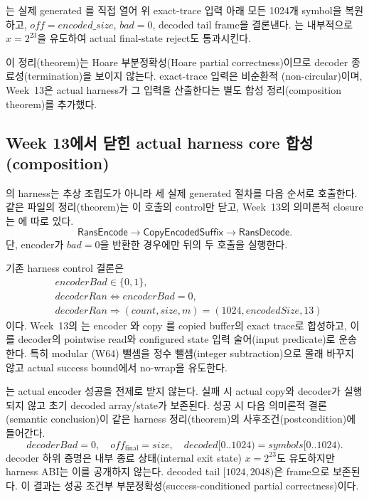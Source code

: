 \begin{verified}
는 실제 generated
를 직접 열어 위 exact-trace 입력 아래 모든 1024개
symbol을 복원하고, \(off=encoded\_size\), \(bad=0\), decoded tail frame을
결론낸다. 는 내부적으로
\(x=2^{23}\)을 유도하여 actual final-state reject도 통과시킨다.
\end{verified}

이 정리(theorem)는 Hoare 부분정확성(Hoare partial correctness)이므로 decoder
종료성(termination)을 보이지 않는다. exact-trace 입력은 비순환적
(non-circular)이며, Week~13은 actual harness가 그 입력을 산출한다는 별도 합성
정리(composition theorem)를 추가했다.

\subsection{Week 13에서 닫힌 actual harness core 합성(composition)}

의 harness는 추상 조립도가 아니라 세 실제
generated 절차를 다음 순서로 호출한다. 같은 파일의 정리(theorem)는 이 호출의
control만 닫고, Week~13의 의미론적 closure는
에 따로 있다.
\[
\mathsf{RansEncode}
\longrightarrow
\mathsf{CopyEncodedSuffix}
\longrightarrow
\mathsf{RansDecode}.
\]
단, encoder가 \(bad=0\)을 반환한 경우에만 뒤의 두 호출을 실행한다.

기존 harness control 결론은
\[
\begin{aligned}
  &\mathit{encoderBad}\in\{0,1\},\\
  &\mathit{decoderRan}\Longleftrightarrow\mathit{encoderBad}=0,\\
  &\mathit{decoderRan}\Longrightarrow
    (count,size,m)=(1024,\mathit{encodedSize},13)
\end{aligned}
\]
이다. Week~13의 는 encoder
와 copy 를 copied buffer의
exact trace로 합성하고, 이를 decoder의 pointwise read와 configured state 입력
술어(input predicate)로 운송한다. 특히 modular (W64) 뺄셈을 정수 뺄셈(integer
subtraction)으로 몰래 바꾸지 않고 actual success bound에서 no-wrap을 유도한다.

\begin{verified}
는 actual encoder 성공을
전제로 받지 않는다. 실패 시 actual copy와 decoder가 실행되지 않고 초기 decoded
array/state가 보존된다. 성공 시 다음 의미론적 결론(semantic conclusion)이 같은
harness 정리(theorem)의 사후조건(postcondition)에 들어간다.
\[
  \mathit{decoderBad}=0,\quad
  off_{\mathrm{final}}=size,\quad
  decoded[0..1024)=symbols[0..1024).
\]
decoder 하위 증명은 내부 종료 상태(internal exit state)
\(x=2^{23}\)도 유도하지만 harness ABI는 이를 공개하지 않는다. decoded tail
\([1024,2048)\)은 frame으로 보존된다. 이 결과는 성공 조건부
부분정확성(success-conditioned partial correctness)이다.
\end{verified}

